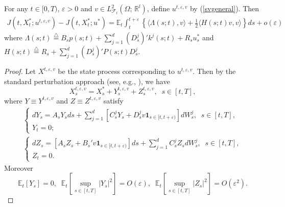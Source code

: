 \documentclass[final]{siamltex}
\begin{document}
\begin{proposition}\label{variate}
 For any $t\in [0,T)$, $\varepsilon>0$ and $v\in L^2_{{{\mathcal F}}_t}(\Omega; \, {\mathbb{R}}^l)$,  define $u^{t,\varepsilon,v}$
by (\ref{svgeneral}). Then
\begin{eqnarray}\label{epsilongeneral}
J(t,X^*_t; u^{t,\varepsilon,v})-J(t,X^*_t; u^*)
=\mathbb E_t\int_t^{t+\varepsilon} \left\{{\langle  {\Lambda(s;t),v} \rangle }
+\frac{1}{2}{\langle  {H(s;t)v, v} \rangle }\right\}ds+o(\varepsilon)
\end{eqnarray}
where $\Lambda(s;t){\stackrel{\triangle}{=}}   B_sp(s;t)+\sum_{j=1}^d(D_s^j)'k^j(s;t)+R_su^*_s$ and
$H(s;t){\stackrel{\triangle}{=}} R_s+\sum_{j=1}^d (D_s^j)'P(s;t)D_s^j$.
\end{proposition}

\begin{proof}
Let $X^{t,\varepsilon,v}$ be the state process corresponding to $u^{t,\varepsilon,v}$. Then
by the standard perturbation approach (see, e.g., \cite{YZ}), we have
\[ X^{t,\varepsilon,v}_s=X^*_s+Y^{t,\varepsilon,v}_s+Z^{t,\varepsilon,v}_s, \;\;s\in[t,T],\]
where $Y\equiv Y^{t,\varepsilon,v}$ and $Z\equiv Z^{t,\varepsilon,v}$ satisfy
\begin{eqnarray*}
\left\{
\begin{array}{l}
dY_s=A_sY_sds + \sum_{j=1}^d[C_s^jY_s+D_s^j v{{\mathbf 1}}_{s\in [t, t+\varepsilon)}]dW_s^j,\;\;s\in[t,T],\\
Y_t=0;
\end{array}\right.\\
\left\{\begin{array}{l}
dZ_s=[A_sZ_s+B_s' v{{\mathbf 1}}_{s\in [t, t+\varepsilon)}]ds + \sum_{j=1}^dC_s^jZ_sdW_s^j,\;\;s\in[t,T],\\
Z_t=0.
\end{array}\right.
\end{eqnarray*}
 Moreover
$${\mathbb{E}_t\left[{Y_s}\right]}=0,\;\; {\mathbb{E}_t\left[{\sup_{s\in [t,T]}|Y_s|^2}\right]}=O(\varepsilon),\;\;
{\mathbb{E}_t\left[{\sup_{s\in [t,T]}|Z_s|^2}\right]}=O(\varepsilon^2).$$


\end{proof}
\end{document}

